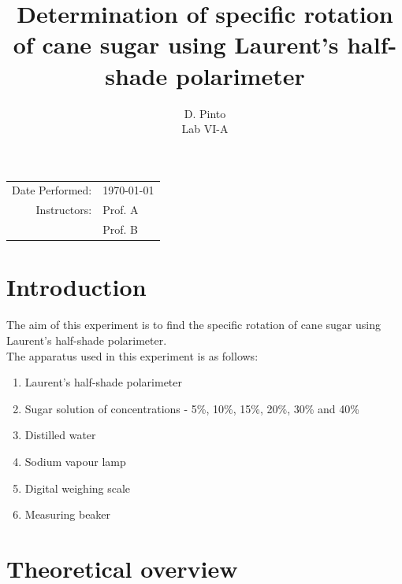\documentclass{dkpinto-report}
\title{\bfseries Determination of specific rotation of cane sugar using Laurent's half-shade polarimeter} %
\author{D. Pinto \\ Lab VI-A}        %
\date{\vspace{-5ex}}                 %
\begin{document}
\begin{titlepage}
\maketitle 

\begin{center}           %
\begin{tabular}{r l}     %
Date Performed: & \today \\ 
Instructors: & Prof.  A \\  
             & Prof. B
\end{tabular}
\end{center}


\tableofcontents  %
\thispagestyle{empty}  %

\end{titlepage}



\section{Introduction} %
The aim of this experiment is to find the specific rotation of cane sugar using Laurent's half-shade polarimeter.\\
The apparatus used in this experiment is as follows:

\begin{enumerate}  %
\item Laurent's half-shade polarimeter
\item Sugar solution of concentrations - 5\%, 10\%, 15\%, 20\%, 30\% and 40\%  %
\item Distilled water
\item Sodium vapour lamp
\item Digital weighing scale
\item Measuring beaker   
\end{enumerate}



\section{Theoretical overview}
\end{document}

